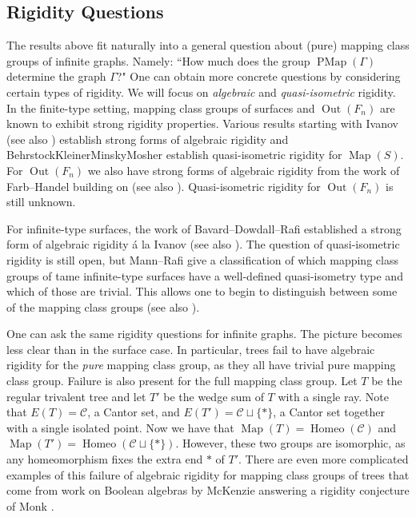 \documentclass[11pt]{amsart}
\theoremstyle{plain}
\theoremstyle{definition}
\DeclareMathOperator{\Out}{Out}
\DeclareMathOperator{\PMap}{PMap}
\DeclareMathOperator{\Homeo}{Homeo}
\DeclareMathOperator{\Map}{Map}
\newcommand{\cC}{\mathcal{C}}
\def\G{{\Gamma}}
\newcommand{\<}{\langle}
\renewcommand{\>}{\rangle}
\begin{document}
\subsection*{Rigidity Questions}
\sloppy
The results above fit naturally into a general question about (pure) mapping class groups of infinite graphs. Namely: ``How much does the group $\PMap(\G)$ determine the graph $\G$?" One can obtain more concrete questions by considering certain types of rigidity. We will focus on \textit{algebraic} and \textit{quasi-isometric} rigidity. In the finite-type setting, mapping class groups of surfaces and $\Out(F_n)$ are known to exhibit strong rigidity properties. Various results starting with Ivanov \cite{Ivanov1988} (see also \cite{McCarthy1986,Harer1986,BLM1983,Ivanov1997}) establish strong forms of algebraic rigidity and Behrstock\discretionary{--}{}{--}Kleiner\discretionary{--}{}{--}Minsky\discretionary{--}{}{--}Mosher \cite{BKMM2012} establish quasi-isometric rigidity for $\Map(S)$. For $\Out(F_n)$ we also have strong forms of algebraic rigidity from the work of Farb--Handel \cite{FH2007} building on \cite{Khramtsov1990,BV2000} (see also \cite{HW2020}). Quasi-isometric rigidity for $\Out(F_n)$ is still unknown.  

For infinite-type surfaces, the work of Bavard--Dowdall--Rafi \cite{BDR2020} established a strong form of algebraic rigidity \'{a} la Ivanov (see also \cite{HMV2018}). The question of quasi-isometric rigidity is still open, but Mann--Rafi \cite{mann2023large} give a classification of which mapping class groups of tame infinite-type surfaces have a well-defined quasi-isometry type and which of those are trivial. This allows one to begin to distinguish between some of the mapping class groups (see also \cite{schaffer2020}). 

One can ask the same rigidity questions for infinite graphs. The picture becomes less clear than in the surface case. In particular, trees fail to have algebraic rigidity for the \emph{pure} mapping class group, as they all have trivial pure mapping class group. Failure is also present for the full mapping class group. Let $T$ be the regular trivalent tree and let $T'$ be the wedge sum of $T$ with a single ray. Note that $E(T) = \cC$, a Cantor set, and $E(T') = \cC \sqcup \{*\}$, a Cantor set together with a single isolated point. Now we have that $\Map(T) = \Homeo(\cC)$ and $\Map(T') = \Homeo(\cC \sqcup \{*\})$. However, these two groups are isomorphic, as any homeomorphism fixes the extra end $*$ of $T'$. There are even more complicated examples of this failure of algebraic rigidity for mapping class groups of trees that come from work on Boolean algebras by McKenzie \cite{McKenzie1977automorphism} answering a rigidity conjecture of Monk \cite{Monk1975automorphism}. 
\end{document}
